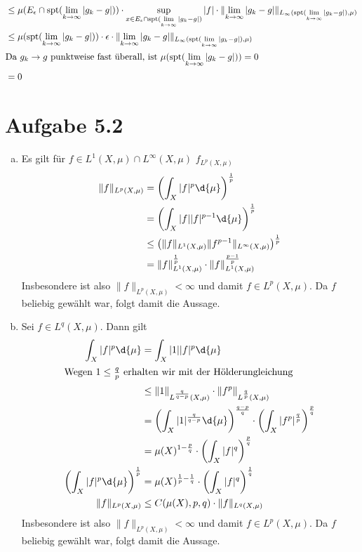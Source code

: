 \documentclass{article}
\newcommand{\norm}[1]{\lVert #1 \rVert}
\begin{document}
\begin{align*}
        &\leq \mu(E_\epsilon \cap \operatorname{spt}(\lim\limits_{k \to \infty} |g_k - g|)) \cdot \sup_{x \in E_\epsilon \cap \operatorname{spt}(\lim\limits_{k \to \infty} |g_k - g|)} |f| \cdot \norm{\lim\limits_{k \to \infty} |g_k - g|}_{L_\infty(\operatorname{spt}(\lim\limits_{k \to \infty} |g_k - g|), \mu)}\\
        &\leq \mu(\operatorname{spt}(\lim\limits_{k \to \infty} |g_k - g|)) \cdot \epsilon \cdot \norm{\lim\limits_{k \to \infty} |g_k - g|}_{L_\infty(\operatorname{spt}(\lim\limits_{k \to \infty} |g_k - g|), \mu)}\\
        \intertext{Da $g_k \to g$ punktweise fast überall, ist $\mu(\operatorname{spt}(\lim\limits_{k \to \infty} |g_k - g|)) = 0$}
        &= 0
    \end{align*}
    \section*{Aufgabe 5.2}
    \begin{enumerate}[(a)]
        \item Es gilt für $f \in L^1(X, \mu) \cap L^\infty(X, \mu)$ $f_{L^p(X, \mu)}$
        \begin{align*}
            \norm{f}_{L^p(X, \mu)} &= \left(\int_X |f|^p \d{\mu}\right)^{\frac{1}{p}}\\
            &= \left(\int_X |f||f|^{p-1} \d{\mu}\right)^{\frac{1}{p}}\\
            &\leq \left(\norm{f}_{L^1(X, \mu)} \norm{f^{p-1}}_{L^\infty(X, \mu)}\right)^{\frac{1}{p}}\\
            &= \norm{f}^{\frac{1}{p}}_{L^1(X, \mu)} \cdot \norm{f}^{\frac{p-1}{p}}_{L^1(X, \mu)}
        \end{align*}
        Insbesondere ist also $\norm{f}_{L^p(X, \mu)} < \infty$ und damit $f \in L^p(X, \mu)$. Da $f$ beliebig gewählt war, folgt damit die Aussage.
        \item Sei $f \in L^q(X, \mu)$. Dann gilt
        \begin{align*}
            \int_X |f|^p \d{\mu} &= \int_X |1||f|^p \d{\mu} \\
            \intertext{Wegen $1\leq \frac{q}{p}$ erhalten wir mit der Hölderungleichung}
            &\leq \norm{1}_{L^{\frac{q}{q-p}}(X, \mu)} \cdot \norm{f^p}_{L^{\frac{q}{p}}(X, \mu)}\\
            &= \left(\int_X |1|^{\frac{q}{q-p}} \d{\mu}\right)^\frac{q-p}{q} \cdot \left(\int_X |f^p|^\frac{q}{p}\right)^\frac{p}{q}\\
            &= \mu(X)^{1- \frac{p}{q}} \cdot \left(\int_X |f|^q\right)^\frac{p}{q}\\
            \left(\int_X |f|^p \d{\mu}\right)^\frac{1}{p} &= \mu(X)^{\frac{1}{p}- \frac{1}{q}} \cdot \left(\int_X |f|^q\right)^\frac{1}{q}\\
            \norm{f}_{L^p(X, \mu)} &\leq C(\mu(X), p,q) \cdot \norm{f}_{L^q(X, \mu)}
        \end{align*}
        Insbesondere ist also $\norm{f}_{L^p(X, \mu)} < \infty$ und damit $f \in L^p(X, \mu)$. Da $f$ beliebig gewählt war, folgt damit die Aussage.
    \end{enumerate}
\end{document}
